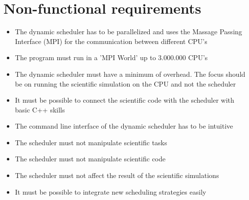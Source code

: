 {
\setcounter{funcNFR}{10}
\renewcommand{\labelitemi}{
	\ifnum \value{funcNFR}<10$/NF 0\arabic{funcNFR} /$\addtocounter{funcNFR}{10}
	\else $/NF \arabic{funcNFR} /$\addtocounter{funcNFR}{10}\fi
}

\section{Non-functional requirements}
	\begin{itemize}
		\item The dynamic scheduler has to be parallelized and uses the Massage Passing Interface (MPI) for the communication between different CPU's
		\item The program must run in a 'MPI World' up to 3.000.000 CPU's
		\item The dynamic scheduler must have a minimum of overhead. The focus should be on running the scientific simulation on the CPU and not the scheduler
		\item It must be possible to connect the scientific code with the scheduler with basic C++ skills
		\item The command line interface of the dynamic scheduler has to be intuitive
		\item The scheduler must not manipulate scientific tasks
		\item The scheduler must not manipulate scientific code
		\item The scheduler must not affect the result of the scientific simulations
		\item It must be possible to integrate new scheduling strategies easily
	\end{itemize}
}